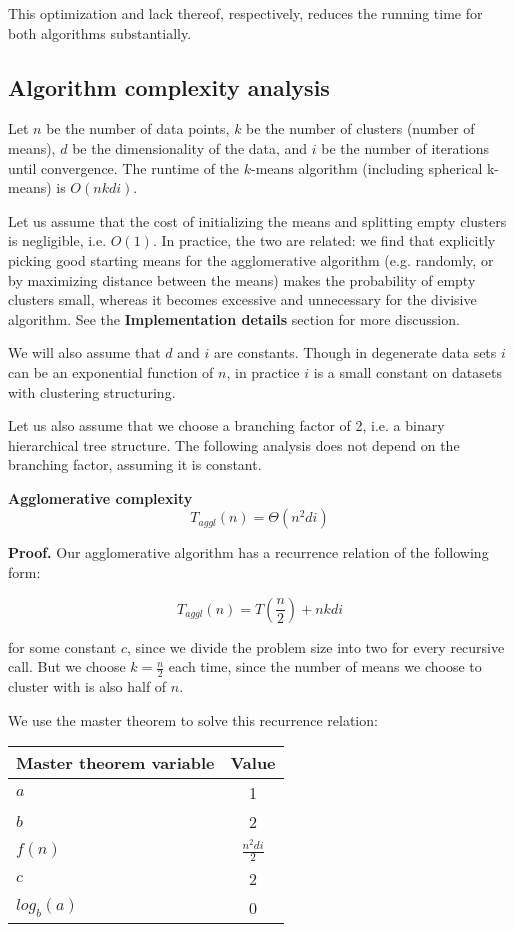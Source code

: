 \documentclass[../tech_report_1.tex]{subfiles}
\begin{document}
This optimization and lack thereof, respectively, reduces the running time for both algorithms substantially.

\subsection*{Algorithm complexity analysis}

Let $n$ be the number of data points, $k$ be the number of clusters (number of means), $d$ be the dimensionality of the data, and $i$ be the number of iterations until convergence. The runtime of the $k$-means algorithm (including spherical k-means) is $O(nkdi)$.

Let us assume that the cost of initializing the means and splitting empty clusters is negligible, i.e. $O(1)$. In practice, the two are related: we find that explicitly picking good starting means for the agglomerative algorithm (e.g. randomly, or by maximizing distance between the means) makes the probability of empty clusters small, whereas it becomes excessive and unnecessary for the divisive algorithm. See the \textbf{Implementation details} section for more discussion.

We will also assume that $d$ and $i$ are constants. Though in degenerate data sets $i$ can be an exponential function of $n$, in practice $i$ is a small constant on datasets with clustering structuring.

Let us also assume that we choose a branching factor of 2, i.e. a binary hierarchical tree structure. The following analysis does not depend on the branching factor, assuming it is constant.

\begin{theorem}

\textbf{Agglomerative complexity} $$T_{aggl}(n) = \Theta(n^2di)$$

\end{theorem}

\textbf{Proof.} Our agglomerative algorithm has a recurrence relation of the following form:

$$ T_{aggl}(n) = T(\frac{n}{2}) + nkdi $$

for some constant $c$, since we divide the problem size into two for every recursive call. But we choose $k=\frac{n}{2}$ each time, since the number of means we choose to cluster with is also half of $n$.

We use the master theorem \cite{thomas2001introduction} to solve this recurrence relation:

\begin{table}[ht]
\centering
\begin{tabular}{l || c }
\hline
\textbf{Master theorem variable} & \textbf{Value} \\
\hline
$a$ & 1 \\
$b$ & 2 \\
$f(n)$ & $\frac{n^2di}{2}$ \\
$c$ & 2 \\
$log_b(a)$ & 0 \\
\hline
\end{tabular}
\end{table}
\end{document}
